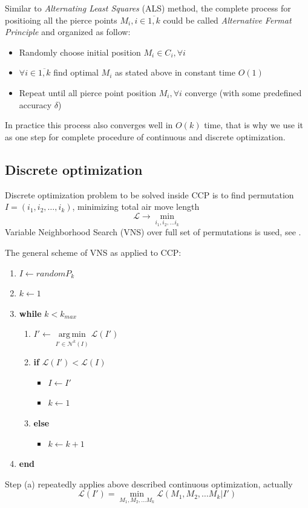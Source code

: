 \documentclass{ifacconf}
\DeclareMathOperator*{\argmin}{arg\,min}
\begin{document}
Similar to
\textit{Alternating Least Squares}
(ALS)
method,
the complete process
for positioing all the pierce points
$M_i, i \in \overline{1,k}$
could be called
\textit{Alternative Fermat Principle}
and organized as follow:
\begin{itemize}
  \item Randomly choose initial position $M_i \in C_i, \forall i$
  \item $\forall i \in \overline{1,k}$ find optimal $M_i$ as stated above in constant time $O(1)$
  \item Repeat until all pierce point position $M_i, \forall i$ converge
  (with some predefined accuracy $\delta$)
\end{itemize}

In practice this process also
converges well in $O(k)$ time,
that is why we use it
as one step for complete
procedure of continuous and discrete optimization.

\subsection{Discrete optimization}

Discrete optimization problem
to be solved inside CCP
is to find permutation
$I=(i_1, i_2, \dots, i_k)$,
minimizing total air move length
$$
\mathcal L \to \min_{i_1, i_2, \dots i_k}
$$
Variable Neighborhood Search
(VNS)
over full set of permutations
is used,
see \cite{Hansen2010Mar}.

The general scheme of VNS as applied to CCP:
\begin{enumerate}
  \item $ I \gets random P_k$
  \item $ k \gets 1$
  \item \textbf{while} $k < k_{max}$
  \begin{enumerate}
  \item $ I' \gets \argmin\limits_{I' \in \mathcal N^k(I)} \mathcal L(I')$
  \item \textbf{if} $\mathcal L(I') < \mathcal L(I)$
  \begin{itemize}
      \item $I \gets I'$
      \item $ k \gets 1$
  \end{itemize}
  \item \textbf{else}
  \begin{itemize}
      \item $ k \gets k+1$
  \end{itemize}
  \end{enumerate}
  \item \textbf{end}
\end{enumerate}
Step (a) repeatedly applies
above described continuous
optimization,
actually
$$
\mathcal L(I') = \min_{M_1, M_2, \dots M_k} \mathcal L(M_1, M_2, \dots M_k | I')
$$
\end{document}
